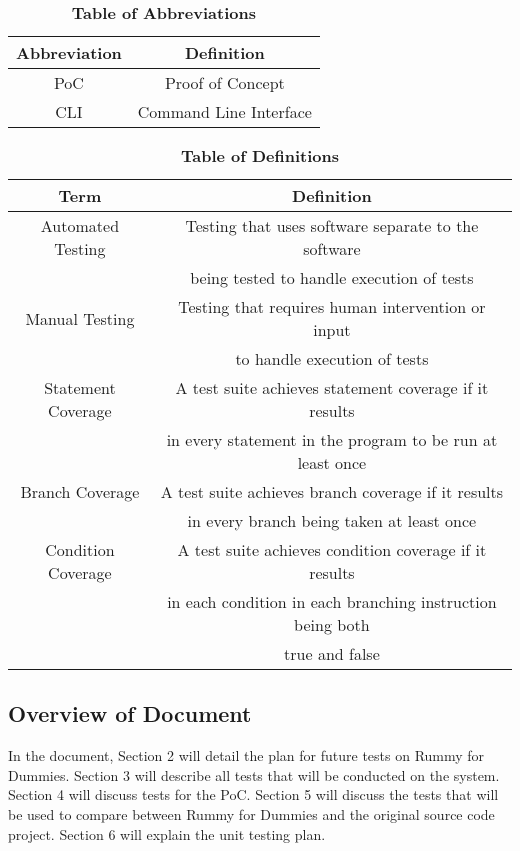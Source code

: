 \documentclass[12pt, titlepage]{article}
\begin{document}
\begin{table}[hbp]
\caption{\textbf{Table of Abbreviations}}
\label{TableAbbrev}
\centering
\begin{tabular}{|c|c|}
    \hline
    \textbf{Abbreviation} & \textbf{Definition} \\
    \hline
    PoC & Proof of Concept \\
    \hline
    CLI & Command Line Interface \\
    \hline
\end{tabular}

\end{table}

\begin{table}[H]
\caption{\textbf{Table of Definitions}}
\label{TableDef}
\centering
\begin{tabular}{|c|c|}
    \hline
    \textbf{Term} & \textbf{Definition}\\
    \hline
    Automated Testing & Testing that uses software separate to the software \\ 
    & being tested to handle execution of tests \\
    \hline
    Manual Testing & Testing that requires human intervention or input \\
    & to handle execution of tests \\
    \hline
    Statement Coverage & A test suite achieves statement coverage if it results \\
     & in every statement in the program to be run at least once \\
    \hline
    Branch Coverage & A test suite achieves branch coverage if it results \\
     & in every branch being taken at least once \\
    \hline
    Condition Coverage & A test suite achieves condition coverage if it results \\
     & in each condition in each branching instruction being both \\ 
     & true and false \\
    \hline
\end{tabular}

\end{table}	

\subsection{Overview of Document}
In the document, Section 2 will detail the plan for future tests on Rummy for Dummies. Section 3 will describe all tests that will be conducted on the system. Section 4 will discuss tests for the PoC. Section 5 will discuss the tests that will be used to compare between Rummy for Dummies and the original source code project. Section 6 will explain the unit testing plan.
\end{document}
